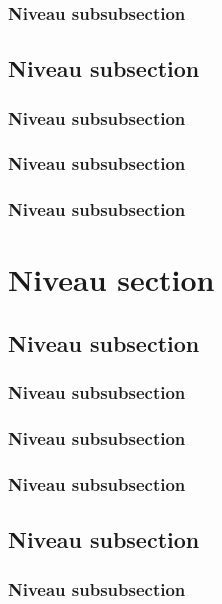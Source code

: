 \documentclass[12pt]{report}
\begin{document}
\subsubsection{Niveau subsubsection}

\subsection{Niveau subsection}

\subsubsection{Niveau subsubsection}

\subsubsection{Niveau subsubsection}

\subsubsection{Niveau subsubsection}

\section{Niveau section}

\subsection{Niveau subsection}

\subsubsection{Niveau subsubsection}

\subsubsection{Niveau subsubsection}

\subsubsection{Niveau subsubsection}

\subsection{Niveau subsection}

\subsubsection{Niveau subsubsection}
\end{document}
